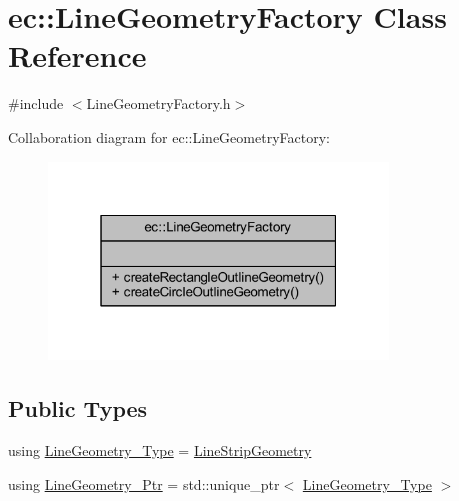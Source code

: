 \hypertarget{classec_1_1_line_geometry_factory}{}\section{ec\+:\+:Line\+Geometry\+Factory Class Reference}
\label{classec_1_1_line_geometry_factory}


{\ttfamily \#include $<$Line\+Geometry\+Factory.\+h$>$}



Collaboration diagram for ec\+:\+:Line\+Geometry\+Factory\+:\nopagebreak
\begin{figure}[H]
\begin{center}
\leavevmode
\includegraphics[width=256pt]{classec_1_1_line_geometry_factory__coll__graph}
\end{center}
\end{figure}
\subsection*{Public Types}
\begin{DoxyCompactItemize}
\item 
using \mbox{\hyperlink{classec_1_1_line_geometry_factory_a3025abbbb9ff132e43d46b17f1381213}{Line\+Geometry\+\_\+\+Type}} = \mbox{\hyperlink{classec_1_1_line_strip_geometry}{Line\+Strip\+Geometry}}
\item 
using \mbox{\hyperlink{classec_1_1_line_geometry_factory_a8f7bd7480ebc0dbc77930d81dcb69678}{Line\+Geometry\+\_\+\+Ptr}} = std\+::unique\+\_\+ptr$<$ \mbox{\hyperlink{classec_1_1_line_geometry_factory_a3025abbbb9ff132e43d46b17f1381213}{Line\+Geometry\+\_\+\+Type}} $>$
\end{DoxyCompactItemize}
